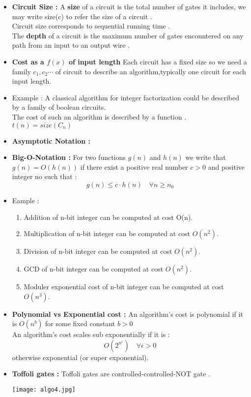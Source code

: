 \documentclass[12pt]{beamer}
\begin{document}
\begin{frame}
\begin{itemize}
\item\textbf{Circuit Size :}
A \textbf{size} of a circuit is the total number of gates it includes, we may write size(c) to refer the size of a circuit .\\
Circuit size corresponds to sequential running time . \\
The \textbf{depth} of a circuit is the maximum number of gates encountered on any path from an input to an output wire .
\item\textbf{Cost as a \(f(x)\) of input length}
Each circuit has a fixed size so we need a family \({c_1,c_2\cdots}\) of circuit to describe an algorithm,typically one circuit for each input length.
\item{Example :}
A classical algorithm for integer factorization could be described by a family of boolean circuits.\\
The cost of such an algorithm is described by a function . \(t(n)=size(C_n)\)
\item\textbf{Asymptotic Notation :}
\item\textbf{Big-O-Notation :}
For two functions \(g(n)\) and \(h(n)\) we write that \(g(n)=O(h(n))\) if there exist a positive real number \(c>0\) and positive integer no such that :
\[
g(n) \leq c\cdot h(n) \quad \forall n \geq n_0
\]
\end{itemize}
\end{frame}
\begin{frame}
\begin{itemize}
\item{Eample :}\\
\begin{enumerate}
\item {Addition of n-bit integer can be computed at cost O(n).}\\
\item{Multiplication of n-bit integer can be computed at cost \(O(n^2)\).}\\
\item{Division of n-bit integer can be computed at cost \(O(n^2)\).}\\
\item{GCD of n-bit integer can be computed at cost \(O(n^2)\).}\\
\item{Moduler exponential cost of n-bit integer can be computed at cost \(O(n^3)\).}\\
\end{enumerate}
\item\textbf{Polynomial vs Exponential cost :}
An algorithm's cost is polynomial if it is \(O(n^b)\) for some fixed constant \(b>0\)\\
An algorithm's cost scales sub exponentially if it is :
\[
O\left(2^{n^{\epsilon}}\right)\quad \forall\epsilon>0
\]
otherwise exponential (or super exponential).
 \item\textbf{Toffoli gates :}
Toffoli gates are controlled-controlled-NOT gate .
    \begin{center}
        \texttt{[image: algo4.jpg]}
    \end{center}
\end{itemize}
\end{frame}
\end{document}
